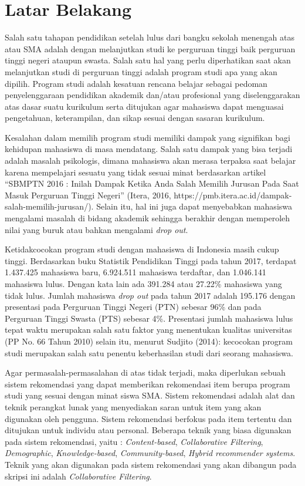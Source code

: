 \documentclass[a4paper,twoside]{article}
\begin{document}
\section{Latar Belakang}
Salah satu tahapan pendidikan setelah lulus dari bangku sekolah menengah atas atau SMA adalah dengan melanjutkan studi ke perguruan tinggi baik perguruan tinggi negeri ataupun swasta. Salah satu hal yang perlu diperhatikan saat akan melanjutkan studi di perguruan tinggi adalah program studi apa yang akan dipilih. Program studi adalah kesatuan rencana belajar sebagai pedoman penyelenggaraan pendidikan akademik dan/atau profesional yang diselenggarakan atas dasar suatu kurikulum serta ditujukan agar mahasiswa dapat menguasai pengetahuan, keterampilan, dan sikap sesuai dengan sasaran kurikulum. %

Kesalahan dalam memilih program studi memiliki dampak yang signifikan bagi kehidupan mahasiswa di masa mendatang. Salah satu dampak yang bisa terjadi adalah masalah psikologis, dimana mahasiswa akan merasa terpaksa saat belajar karena mempelajari sesuatu yang tidak sesuai minat berdasarkan artikel “SBMPTN 2016 : Inilah Dampak Ketika Anda Salah Memilih Jurusan Pada Saat Masuk Perguruan Tinggi Negeri” (Itera, 2016, https://pmb.itera.ac.id/dampak-salah-memilih-jurusan/). Selain itu, hal ini juga dapat menyebabkan mahasiswa mengalami masalah di bidang akademik sehingga berakhir dengan memperoleh nilai yang buruk atau bahkan mengalami \textit{drop out}.

Ketidakcocokan program studi dengan mahasiswa di Indonesia masih cukup tinggi. Berdasarkan buku Statistik Pendidikan Tinggi pada tahun 2017, terdapat 1.437.425 mahasiswa baru, 6.924.511 mahasiswa terdaftar, dan 1.046.141 mahasiswa lulus. Dengan kata lain ada 391.284 atau 27.22\% mahasiswa yang tidak lulus. Jumlah mahasiswa \textit{drop out} pada tahun 2017 adalah 195.176 dengan presentasi pada Perguruan Tinggi Negeri (PTN) sebesar 96\% dan pada Perguruan Tinggi Swasta (PTS) sebesar 4\%. Presentasi jumlah mahasiswa lulus tepat waktu merupakan salah satu faktor yang menentukan kualitas universitas (PP No. 66 Tahun 2010) selain itu, menurut Sudjito (2014): kecocokan program studi merupakan salah satu penentu keberhasilan studi dari seorang mahasiswa. %

Agar permasalah-permasalahan di atas tidak terjadi, maka diperlukan sebuah sistem rekomendasi  yang dapat memberikan rekomendasi item berupa program studi yang sesuai dengan minat siswa SMA. Sistem rekomendasi adalah alat dan teknik perangkat lunak yang menyediakan saran untuk item yang akan digunakan oleh pengguna. Sistem rekomendasi berfokus pada item tertentu dan ditujukan untuk individu atau personal. Beberapa teknik yang biasa digunakan pada sistem rekomendasi, yaitu : \textit{Content-based}, \textit{Collaborative Filtering}, \textit{Demographic}, \textit{Knowledge-based}, \textit{Community-based}, \textit{Hybrid recommender systems}. Teknik yang akan digunakan pada sistem rekomendasi yang akan dibangun pada skripsi ini adalah \textit{Collaborative Filtering}.
\end{document}
